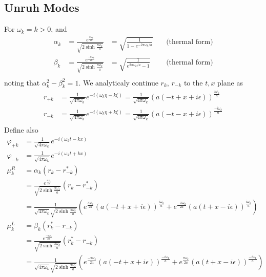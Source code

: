 \documentclass[12pt,a4paper]{article}
\begin{document}
\subsection{Unruh Modes}
For $\omega_k = k > 0$, and
\begin{equation}
  \begin{array}{llll}
    \alpha_k &= \frac{e^{\frac{\pi\omega_k}{2a}}}{\sqrt{2 \sinh \frac{\pi \omega_k}{a}}} &= \sqrt{\frac{1}{1 - e^{-2\pi\omega_k / a}}} & \quad \text{(thermal form)} \\
    \beta_k &= \frac{e^{\frac{-\pi\omega_k}{2a}}}{\sqrt{2 \sinh \frac{\pi \omega_k}{a}}} &= \sqrt{\frac{1}{e^{2\pi\omega_k / a} - 1}} & \quad \text{(thermal form)} \\
  \end{array}
  \label{alpha_beta}
\end{equation}
noting that $\alpha_k^2 - \beta_k^2 = 1$. We analyticaly continue $r_k$, $r_{-k}$ to the $t,x$ plane as
\begin{equation}
  \begin{array}{ll}
    r_{+k} &= \frac{1}{\sqrt{4 \pi \omega_k}} e^{-i(\omega_k \eta - k \xi)} = \frac{1}{\sqrt{4 \pi \omega_k}} (a(-t + x + i \epsilon))^{\frac{i \omega_k}{a}} \\
    r_{-k} &= \frac{1}{\sqrt{4 \pi \omega_k}} e^{-i(\omega_k \eta + k \xi)} = \frac{1}{\sqrt{4 \pi \omega_k}} (a(-t - x + i \epsilon))^{\frac{-i \omega_k}{a}} \\
  \end{array}
\end{equation}
Define also
\begin{equation}
  \begin{array}{ll}
    \varphi_{+k} &= \frac{1}{\sqrt{4 \pi \omega_k}} e^{-i(\omega_k t - k x)}\\
    \varphi_{-k} &= \frac{1}{\sqrt{4 \pi \omega_k}} e^{-i(\omega_k t + k x)}\\
    \mu^R_k &= \alpha_k (r_k - r_{-k}^*) \\
    &= \frac{e^{\frac{\pi \omega_k}{2a}}}{\sqrt{2 \sinh \frac{\pi \omega_k}{a}}} \left(r_k - r_{-k}^* \right) \\
    &= \frac{1}{\sqrt{4 \pi \omega_k}\sqrt{2 \sinh \frac{\pi \omega_k}{a}}} \left( e^{\frac{\pi \omega_k}{2a}} \left(a(-t+x+i\epsilon)\right)^{\frac{i\omega_k}{a}} + e^{\frac{-\pi \omega_k}{2a}} \left(a(t+x-i\epsilon)\right)^{\frac{i\omega_k}{a}} \right) \\
    \mu^L_k &= \beta_k (r_k^* - r_{-k} )\\
    &=\frac{e^{\frac{-\pi \omega_k}{2a}}}{\sqrt{2 \sinh \frac{\pi \omega_k}{a}}} \left(r_k^* - r_{-k} \right) \\
    &=\frac{1}{\sqrt{4 \pi \omega_k}\sqrt{2 \sinh \frac{\pi \omega_k}{a}}} \left( e^{\frac{-\pi \omega_k}{2a}} \left(a(-t+x+i\epsilon)\right)^{\frac{-i\omega_k}{a}} + e^{\frac{\pi \omega_k}{2a}} \left(a(t+x-i\epsilon)\right)^{\frac{-i\omega_k}{a}} \right) \\
  \end{array}
\end{equation}
\end{document}
